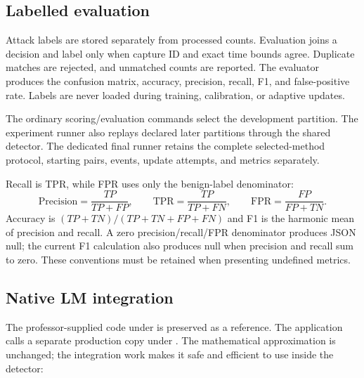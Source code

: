 \subsection{Labelled evaluation}

Attack labels are stored separately from processed counts. Evaluation joins a
decision and label only when capture ID and exact time bounds agree. Duplicate
matches are rejected, and unmatched counts are reported. The evaluator produces
the confusion matrix, accuracy, precision, recall, F1, and false-positive rate. Labels are never
loaded during training, calibration, or adaptive updates.

The ordinary scoring/evaluation commands select the development partition.
The experiment runner also replays declared later partitions through the shared
detector. The dedicated final runner retains the complete selected-method
protocol, starting pairs, events, update attempts, and metrics separately.

Recall is TPR, while FPR uses only the benign-label denominator:
\[
\mathrm{Precision}=\frac{TP}{TP+FP},\qquad
\mathrm{TPR}=\frac{TP}{TP+FN},\qquad
\mathrm{FPR}=\frac{FP}{FP+TN}.
\]
Accuracy is $(TP+TN)/(TP+TN+FP+FN)$ and F1 is the harmonic mean of precision and
recall. A zero precision/recall/FPR denominator produces JSON null; the current
F1 calculation also produces null when precision and recall sum to zero.
These conventions must be retained when presenting undefined metrics.

\subsection{Native LM integration}
\label{sec:lm-changes}

The professor-supplied code under  is preserved as a
reference. The application calls a separate production copy under
. The mathematical approximation is
unchanged; the integration work makes it safe and efficient to use inside the
detector:

